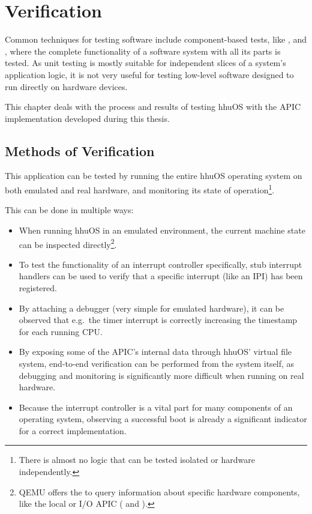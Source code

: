 \chapter{Verification}
\label{ch:verification}

Common techniques for testing software include component-based tests, like , and , where the complete functionality of a software system with all its parts is tested.
As unit testing is mostly suitable for independent slices of a system's application logic, it is not very useful for testing low-level software designed to run directly on hardware devices.

This chapter deals with the process and results of testing hhuOS with the APIC implementation developed during this thesis.

\clearpage

\section{Methods of Verification}
\label{sec:verificationmethods}

This application can be tested by running the entire hhuOS operating system on both emulated and real hardware, and monitoring its state of operation\footnote{
  There is almost no logic that can be tested isolated or hardware independently.}.

This can be done in multiple ways:

\begin{itemize}
  \item When running hhuOS in an emulated environment, the current machine state can be inspected directly\footnote{
          QEMU offers the  to query information about specific hardware components, like the local or I/O APIC ( and ).}.
  \item To test the functionality of an interrupt controller specifically, stub interrupt handlers can be used to verify that a specific interrupt (like an IPI) has been registered.
  \item By attaching a debugger (very simple for emulated hardware), it can be observed that e.g.\ the timer interrupt is correctly increasing the timestamp for each running CPU\@.
  \item By exposing some of the APIC's internal data through hhuOS' virtual file system, end-to-end verification can be performed from the system itself, as debugging and monitoring is significantly more difficult when running on real hardware.
  \item Because the interrupt controller is a vital part for many components of an operating system, observing a successful boot is already a significant indicator for a correct implementation.
\end{itemize}

